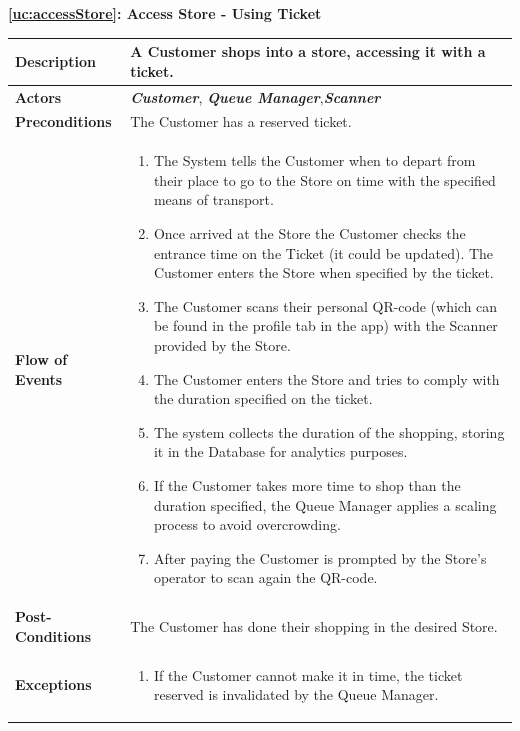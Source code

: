 \documentclass[a4paper, 12pt, oneside]{article}
\begin{document}
\begin{center}
{\textbf{\ref{uc:accessStore}: Access Store - Using Ticket}}
\end{center}
\begin{tabularx}{\linewidth}{| l | X |}
    
    \hline
    \textbf{Description} & A Customer shops into a store, accessing it with a ticket.\\
    

    \hline
    \textbf{Actors} & \textbf{\textit{Customer}}, \textit{\textbf{Queue Manager}},\textit{\textbf{Scanner}} \\
    
    \hline
    \textbf{Preconditions} & The Customer has a reserved ticket.\\
    
    \hline
    \textbf{Flow of Events} & \parbox{0.7\textwidth}{   
        \begin{enumerate}
            \item The System tells the Customer when to depart from their place to go to the Store on time with the specified means of transport.
            \item Once arrived at the Store the Customer checks the entrance time on the Ticket (it could be updated). The Customer enters the Store when specified by the ticket.
            \item The Customer scans their personal QR-code (which can be found in the profile tab in the app) with the Scanner provided by the Store.
            \item The Customer enters the Store and tries to comply with the duration specified on the ticket.
            \item The system collects the duration of the shopping, storing it in the Database for analytics purposes.
            \item If the Customer takes more time to shop than the duration specified, the Queue Manager applies a scaling process to avoid overcrowding.
            \item After paying the Customer is prompted by the Store's operator to scan again the QR-code.
    \end{enumerate}}\\
    
    \hline
    \textbf{Post-Conditions} & The Customer has done their shopping in the desired Store.\\
    
    \hline
    \textbf{Exceptions} & \parbox{0.7\textwidth}{ \begin{enumerate}
            \item If the Customer cannot make it in time, the ticket reserved is invalidated by the Queue Manager.
        \end{enumerate}}\\

    \hline
    
\end{tabularx}
\end{document}
